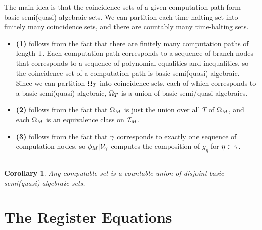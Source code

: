 \documentclass[twoside]{article}
\newtheorem{corollary}{Corollary}[section]
\newenvironment{proofsketch}{{\bf Proof Sketch:}}{\hfill\rule{2mm}{2mm}}
\begin{document}
  \begin{proofsketch}
    
    The main idea is that the coincidence sets of a given computation
    path form basic semi(quasi)-algebraic sets.  We can partition
    each time-halting set into finitely many coincidence sets, and
    there are countably many time-halting sets.

    \begin{itemize}
    \item \textbf{(1)} follows from the fact that there are finitely
      many computation paths of length T.  Each computation path
      corresponds to a sequence of branch nodes that corresponds to a
      sequence of polynomial equalities and inequalities, so the
      coincidence set of a computation path is basic
      semi(quasi)-algebraic. Since we can partition $\Omega_T$ into
      coincidence sets, each of which corresponds to a basic
      semi(quasi)-algebraic, $\Omega_T$ is a union of basic
      semi/quasi-algebraics.
    \item \textbf{(2)} follows from the fact that $\Omega_M$ is just
      the union over all $T$ of $\Omega_M$, and each $\Omega_M$ is
      an equivalence class on $\mathcal{I}_M$.
    \item \textbf{(3)} follows from the fact that $\gamma$
      corresponds to exactly one sequence of computation nodes, so
      $\phi_M|\mathcal{V}_{\gamma}$ computes the composition of
      $g_{\eta}$ for $\eta \in \gamma$.
    \end{itemize}
  \end{proofsketch}

  \begin{corollary}
    Any computable set is a countable union of disjoint basic
    semi(quasi)-algebraic sets.
  \end{corollary}

\section{The Register Equations}






\end{document}
